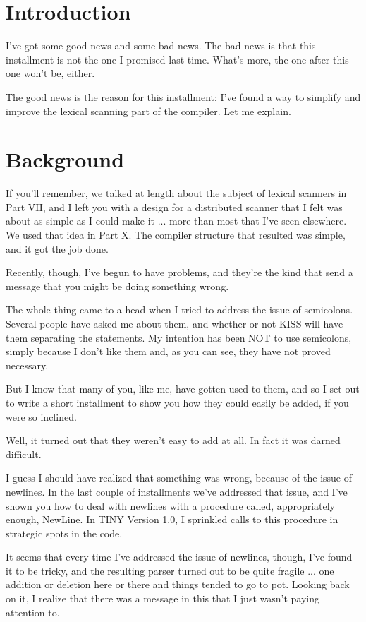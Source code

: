 \documentclass[float=false, crop=false]{standalone}
\begin{document}
\section{Introduction}

I've got some good news and some bad news. The bad news is that this installment
is not the one I promised last time. What's more, the one after this one won't
be, either.

The good news is the reason for this installment: I've found a way to simplify
and improve the lexical scanning part of the compiler. Let me explain.


\section{Background}

If you'll remember, we talked at length about the subject of lexical scanners in
Part VII, and I left you with a design for a distributed scanner that I felt was
about as simple as I could make it ... more than most that I've seen elsewhere.
We used that idea in Part X. The compiler structure that resulted was simple,
and it got the job done.

Recently, though, I've begun to have problems, and they're the kind that send a
message that you might be doing something wrong.

The whole thing came to a head when I tried to address the issue of semicolons.
Several people have asked me about them, and whether or not KISS will have them
separating the statements. My intention has been NOT to use semicolons, simply
because I don't like them and, as you can see, they have not proved necessary.

But I know that many of you, like me, have gotten used to them, and so I set out
to write a short installment to show you how they could easily be added, if you
were so inclined.

Well, it turned out that they weren't easy to add at all. In fact it was darned
difficult.

I guess I should have realized that something was wrong, because of the issue of
newlines. In the last couple of installments we've addressed that issue, and
I've shown you how to deal with newlines with a procedure called, appropriately
enough, NewLine. In TINY Version 1.0, I sprinkled calls to this procedure in
strategic spots in the code.

It seems that every time I've addressed the issue of newlines, though, I've
found it to be tricky, and the resulting parser turned out to be quite fragile
... one addition or deletion here or there and things tended to go to pot.
Looking back on it, I realize that there was a message in this that I just
wasn't paying attention to.
\end{document}
